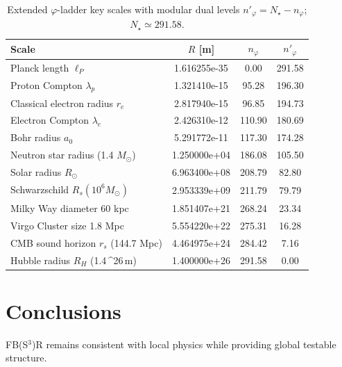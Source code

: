 \documentclass[aps,prd,reprint,onecolumn,nofootinbib]{revtex4-2}
\begin{document}
\begin{table}[t]
\caption{Extended $\varphi$-ladder key scales with modular dual levels $n'_\varphi=N_\star-n_\varphi$; $N_\star\simeq 291.58$.}
\centering
\begin{ruledtabular}
\begin{tabular}{lccc}
\textbf{Scale} & $R$ [m] & $n_\varphi$ & $n'_\varphi$ \\
\hline
Planck length $\ell_P$ & 1.616255e-35 & 0.00 & 291.58 \\
Proton Compton $\lambda_p$ & 1.321410e-15 & 95.28 & 196.30 \\
Classical electron radius $r_e$ & 2.817940e-15 & 96.85 & 194.73 \\
Electron Compton $\lambda_e$ & 2.426310e-12 & 110.90 & 180.69 \\
Bohr radius $a_0$ & 5.291772e-11 & 117.30 & 174.28 \\
Neutron star radius (1.4 $M_\odot$) & 1.250000e+04 & 186.08 & 105.50 \\
Solar radius $R_\odot$ & 6.963400e+08 & 208.79 & 82.80 \\
Schwarzschild $R_s(10^6 M_\odot)$ & 2.953339e+09 & 211.79 & 79.79 \\
Milky Way diameter 60 kpc & 1.851407e+21 & 268.24 & 23.34 \\
Virgo Cluster size 1.8 Mpc & 5.554220e+22 & 275.31 & 16.28 \\
CMB sound horizon $r_s$ (144.7 Mpc) & 4.464975e+24 & 284.42 & 7.16 \\
Hubble radius $R_H$ (1.4\,\times 10^{26}\,m) & 1.400000e+26 & 291.58 & 0.00 \\
\end{tabular}
\end{ruledtabular}
\end{table}

\section{Conclusions}
FB(S$^3$)R remains consistent with local physics while providing global testable structure.
\end{document}
